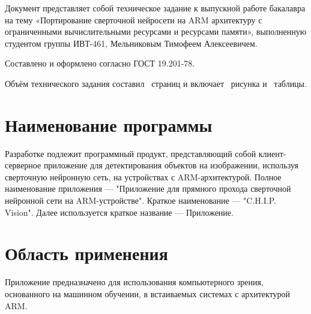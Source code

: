 \documentclass[a4paper,english]{G2-105}
\begin{document}
\VSTUMakeCenteredTOC
{}
\VSTUSetDocumentNumbersPrefix{}
\par Документ представляет собой техническое задание к выпускной работе бакалавра на тему «Портирование сверточной нейросети на ARM архитектуру с ограниченными вычислительными ресурсами и ресурсами памяти», выполненную студентом группы ИВТ-461, Мельниковым Тимофеем Алексеевичем.
\par Составлено и оформлено согласно ГОСТ 19.201-78.
\par Объём технического задания составил \totalpages~страниц и включает \totalfigures~рисунка и \totaltables~таблицы. 
\VSTUInitializeTZ
\tableofcontents
\newpage


\section{Наименование программы}
\par Разработке подлежит программный продукт, представляющий собой клиент-серверное приложение для детектирования объектов на изображении, используя сверточную нейронную сеть, на устройствах с ARM-архитектурой.
Полное наименование приложения --- "Приложение для прямного прохода сверточной нейронной сети на ARM-устройстве". Краткое наименование --- "C.H.I.P. Vision". Далее используется краткое название --- Приложение.

\section{Область применения}
\par Приложение предназначено для использования компьютерного зрения, основанного на машинном обучении, в встаиваемых системах с архитектурой ARM.
\end{document}
